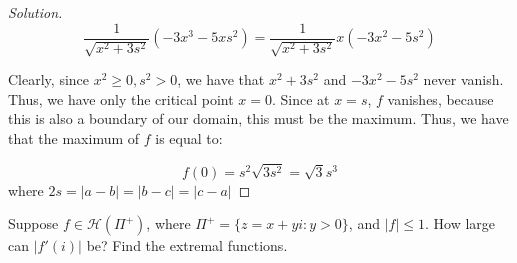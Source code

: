 \documentclass[10pt]{article}
\newenvironment{problem}[2][]{\begin{trivlist}
\item[\hskip \labelsep {\bfseries #1}\hskip \labelsep {\bfseries #2.}]}{\end{trivlist}}
\begin{document}
\begin{proof}[Solution]
$$ \frac{1}{ \sqrt{x^2 + 3s^2} } (-3x^3 - 5xs^2) = \frac{1}{ \sqrt{x^2 + 3s^2} } x(-3x^2-5s^2)$$

Clearly, since $x^2 \geq 0, s^2 > 0$, we have that $x^2 + 3s^2$ and $-3x^2-5s^2$ never vanish. Thus, we have only the critical point $x = 0$. Since at $x=s$, $f$ vanishes, because this is also a boundary of our domain, this must be the maximum. Thus, we have that the maximum of $f$ is equal to:

$$ f(0) = s^2 \sqrt{3s^2} = \sqrt{3} s^3$$ where $2s = |a - b | = |b - c| = |c - a|$

\end{proof}

\begin{problem}{Question 3}

Suppose $f \in \mathcal{H}(\Pi^+)$, where $\Pi^+= \{ z = x + yi : y > 0 \}$, and $|f| \leq 1$. How large can $|f'(i)|$ be? Find the extremal functions.

\end{problem}
\end{document}
